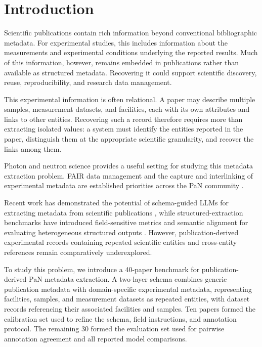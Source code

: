 \section{Introduction}
\label{sec:introduction}

Scientific publications contain rich information beyond conventional
bibliographic metadata. For experimental studies, this includes information
about the measurements and experimental conditions underlying the reported
results. Much of this information, however, remains embedded in publications
rather than available as structured metadata. Recovering it could support
scientific discovery, reuse, reproducibility, and research data management.

This experimental information is often relational. A paper may describe
multiple samples, measurement datasets, and facilities, each with its own
attributes and links to other entities. Recovering such a record therefore
requires more than extracting isolated values: a system must identify the
entities reported in the paper, distinguish them at the appropriate scientific
granularity, and recover the links among them.

Photon and neutron science provides a useful setting for studying this
metadata extraction problem. FAIR data management and the capture and
interlinking of experimental metadata are established priorities across the
PaN community
\citep{murphy2025fair,expands2022fair,lohstroh2025daphne}.

Recent work has demonstrated the potential of schema-guided LLMs for
extracting metadata from scientific publications \citep{alyafeai2025mole},
while structured-extraction benchmarks have introduced field-sensitive metrics
and semantic alignment for evaluating heterogeneous structured outputs
\citep{ferguson2026extractbench}. However, publication-derived experimental
records containing repeated scientific entities and cross-entity references
remain comparatively underexplored.

To study this problem, we introduce a 40-paper benchmark for
publication-derived PaN metadata extraction. A two-layer schema combines
generic publication metadata with domain-specific experimental metadata,
representing facilities, samples, and measurement datasets as repeated
entities, with dataset records referencing their associated facilities and
samples. Ten papers formed the calibration set used to refine the schema,
field instructions, and annotation protocol. The remaining 30 formed the
evaluation set used for pairwise annotation agreement and all reported model 
comparisons.

